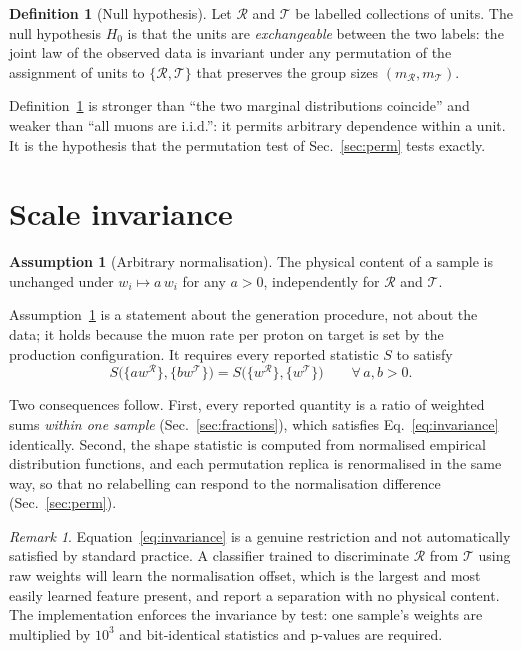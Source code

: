 \documentclass[11pt,a4paper]{article}
\theoremstyle{definition}
\newtheorem{definition}{Definition}[section]
\newtheorem{assumption}{Assumption}[section]
\theoremstyle{plain}
\theoremstyle{remark}
\newtheorem{remark}{Remark}[section]
\newcommand{\Rr}{\mathcal{R}}
\newcommand{\Tt}{\mathcal{T}}
\begin{document}
\begin{definition}[Null hypothesis]
\label{def:h0}
Let $\Rr$ and $\Tt$ be labelled collections of units. The null hypothesis
$H_0$ is that the units are \emph{exchangeable} between the two labels: the
joint law of the observed data is invariant under any permutation of the
assignment of units to $\{\Rr, \Tt\}$ that preserves the group sizes
$(m_\Rr, m_\Tt)$.
\end{definition}

Definition~\ref{def:h0} is stronger than ``the two marginal distributions
coincide'' and weaker than ``all muons are i.i.d.'': it permits arbitrary
dependence within a unit. It is the hypothesis that the permutation test of
Sec.~\ref{sec:perm} tests exactly.

\section{Scale invariance}
\label{sec:scale}

\begin{assumption}[Arbitrary normalisation]
\label{ass:scale}
The physical content of a sample is unchanged under $w_i \mapsto a\,w_i$ for any
$a>0$, independently for $\Rr$ and $\Tt$.
\end{assumption}

Assumption~\ref{ass:scale} is a statement about the generation procedure, not
about the data; it holds because the muon rate per proton on target is set by
the production configuration. It requires every reported statistic $S$ to
satisfy
\begin{equation}
  S\bigl(\{a w^{\Rr}\}, \{b w^{\Tt}\}\bigr)
  = S\bigl(\{w^{\Rr}\}, \{w^{\Tt}\}\bigr)
  \qquad \forall\, a,b>0.
  \label{eq:invariance}
\end{equation}

Two consequences follow. First, every reported quantity is a ratio of weighted
sums \emph{within one sample} (Sec.~\ref{sec:fractions}), which satisfies
Eq.~\eqref{eq:invariance} identically. Second, the shape statistic is computed
from normalised empirical distribution functions, and each permutation replica
is renormalised in the same way, so that no relabelling can respond to the
normalisation difference (Sec.~\ref{sec:perm}).

\begin{remark}
Equation~\eqref{eq:invariance} is a genuine restriction and not automatically
satisfied by standard practice. A classifier trained to discriminate $\Rr$ from
$\Tt$ using raw weights will learn the normalisation offset, which is the
largest and most easily learned feature present, and report a separation with no
physical content. The implementation enforces the invariance by test: one
sample's weights are multiplied by $10^{3}$ and bit-identical statistics and
p-values are required.
\end{remark}
\end{document}
